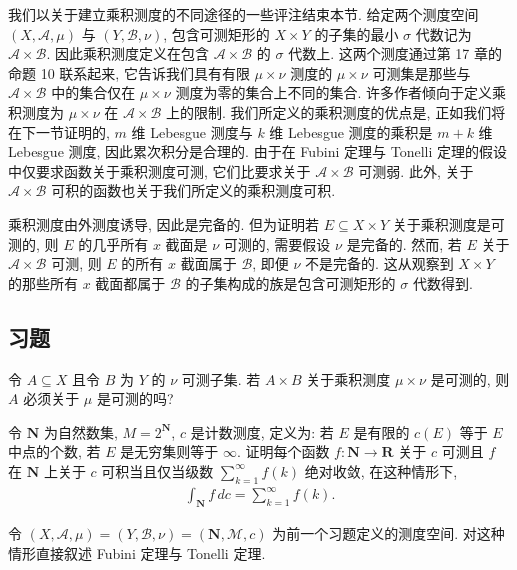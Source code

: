 \documentclass[../../main.tex]{subfiles}
\begin{document}
我们以关于建立乘积测度的不同途径的一些评注结束本节. 给定两个测度空间 $(X,\mathcal{A},\mu)$ 与 $(Y,\mathcal{B},\nu)$, 包含可测矩形的 $X\times Y$ 的子集的最小 $\sigma$ 代数记为 $\mathcal{A}\times\mathcal{B}$. 因此乘积测度定义在包含 $\mathcal{A}\times\mathcal{B}$ 的 $\sigma$ 代数上. 这两个测度通过第 17 章的命题 10 联系起来, 它告诉我们具有有限 $\mu\times\nu$ 测度的 $\mu\times\nu$ 可测集是那些与 $\mathcal{A}\times\mathcal{B}$ 中的集合仅在 $\mu\times\nu$ 测度为零的集合上不同的集合. 许多作者倾向于定义乘积测度为 $\mu\times\nu$ 在 $\mathcal{A}\times\mathcal{B}$ 上的限制. 我们所定义的乘积测度的优点是, 正如我们将在下一节证明的, $m$ 维 Lebesgue 测度与 $k$ 维 Lebesgue 测度的乘积是 $m+k$ 维 Lebesgue 测度, 因此累次积分是合理的. 由于在 Fubini 定理与 Tonelli 定理的假设中仅要求函数关于乘积测度可测, 它们比要求关于 $\mathcal{A}\times\mathcal{B}$ 可测弱. 此外, 关于 $\mathcal{A}\times\mathcal{B}$ 可积的函数也关于我们所定义的乘积测度可积.

乘积测度由外测度诱导, 因此是完备的. 但为证明若 $E\subseteq X\times Y$ 关于乘积测度是可测的, 则 $E$ 的几乎所有 $x$ 截面是 $\nu$ 可测的, 需要假设 $\nu$ 是完备的. 然而, 若 $E$ 关于 $\mathcal{A}\times\mathcal{B}$ 可测, 则 $E$ 的所有 $x$ 截面属于 $\mathcal{B}$, 即便 $\nu$ 不是完备的. 这从观察到 $X\times Y$ 的那些所有 $x$ 截面都属于 $\mathcal{B}$ 的子集构成的族是包含可测矩形的 $\sigma$ 代数得到.

\subsection*{习题}

\begin{exercise}\label{exercise:ch20-01}
令 $A\subseteq X$ 且令 $B$ 为 $Y$ 的 $\nu$ 可测子集. 若 $A\times B$ 关于乘积测度 $\mu\times\nu$ 是可测的, 则 $A$ 必须关于 $\mu$ 是可测的吗?
\end{exercise}

\begin{exercise}\label{exercise:ch20-02}
令 $\mathbf{N}$ 为自然数集, $M=2^{\mathbf{N}}$, $c$ 是计数测度, 定义为: 若 $E$ 是有限的 $c(E)$ 等于 $E$ 中点的个数, 若 $E$ 是无穷集则等于 $\infty$. 证明每个函数 $f:\mathbf{N}\to\mathbf{R}$ 关于 $c$ 可测且 $f$ 在 $\mathbf{N}$ 上关于 $c$ 可积当且仅当级数 $\sum_{k=1}^{\infty}f(k)$ 绝对收敛, 在这种情形下,
\begin{align*}
\int_{\mathbf{N}}f\,dc=\sum_{k=1}^{\infty}f(k).
\end{align*}
\end{exercise}

\begin{exercise}\label{exercise:ch20-03}
令 $(X,\mathcal{A},\mu)=(Y,\mathcal{B},\nu)=(\mathbf{N},\mathcal{M},c)$ 为前一个习题定义的测度空间. 对这种情形直接叙述 Fubini 定理与 Tonelli 定理.
\end{exercise}
\end{document}

